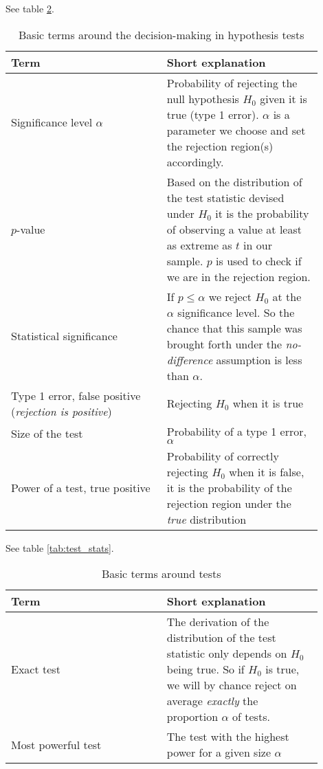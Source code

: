 See table \ref{tab:dec_mak}.
\begin{table}
    \centering
    \begin{tabular}{|p{0.45\linewidth}|p{0.45\linewidth}|}
        \hline \textcolor{blue1}{Term} & \textcolor{blue1}{Short explanation} \\
        \hline
        Significance level $\alpha$ & Probability of rejecting the null hypothesis $H_0$ given it is true (type 1 error). $\alpha$ is a
        parameter we choose and set the rejection region(s) accordingly. \\
        \hline
        $p$-value & Based on the distribution of the test statistic devised under $H_0$ it is the probability of observing a value
        at least as extreme as $t$ in our sample. $p$ is used to check if we are in the rejection region. \\
        \hline
        Statistical significance & If $p\leq \alpha$ we reject $H_0$ at the $\alpha$ significance level. So the chance
        that this sample was brought forth under the \textit{no-difference} assumption is less than $\alpha$.\\
        \hline
        Type 1 error, false positive (\textit{rejection is positive}) & Rejecting $H_0$ when it is true \\
        \hline
        Size of the test & Probability of a type 1 error, $\alpha$ \\
        \hline
        Power of a test, true positive & Probability of correctly rejecting $H_0$ when it is false, it is
        the probability of the rejection region under the \textit{true} distribution \\
        \hline
    \end{tabular}
    \caption{Basic terms around the decision-making in hypothesis tests}
    \label{tab:dec_mak}
\end{table}

See table \ref{tab:test_stats}.
\begin{table}
    \centering
    \begin{tabular}{|p{0.45\linewidth}|p{0.45\linewidth}|}
        \hline \textcolor{blue1}{Term} & \textcolor{blue1}{Short explanation} \\
        \hline
        Exact test & The derivation of the distribution of the test statistic only depends on $H_0$ being
        true. So if $H_0$ is true, we will by chance reject on average \textit{exactly} the proportion $\alpha$ of tests. \\
        \hline
        Most powerful test & The test with the highest power for a given size $\alpha$ \\
        \hline
    \end{tabular}
    \caption{Basic terms around tests}
    \label{tab:dec_mak}
\end{table}

